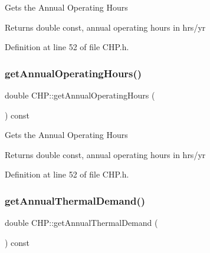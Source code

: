 Gets the Annual Operating Hours

\begin{DoxyReturn}{Returns}
double const, annual operating hours in hrs/yr 
\end{DoxyReturn}


Definition at line 52 of file C\+H\+P.\+h.

\mbox{\label{class_c_h_p_aeeb03f1f40db034babf883a1e00ed2a3}} 
\subsubsection{\texorpdfstring{get\+Annual\+Operating\+Hours()}{getAnnualOperatingHours()}\hspace{0.1cm}{\footnotesize\ttfamily [3/3]}}
{\footnotesize\ttfamily double C\+H\+P\+::get\+Annual\+Operating\+Hours (\begin{DoxyParamCaption}{ }\end{DoxyParamCaption}) const\hspace{0.3cm}{\ttfamily [inline]}}

Gets the Annual Operating Hours

\begin{DoxyReturn}{Returns}
double const, annual operating hours in hrs/yr 
\end{DoxyReturn}


Definition at line 52 of file C\+H\+P.\+h.

\mbox{\label{class_c_h_p_a849a576483b92b131ebfc0615e1e0bdb}} 
\subsubsection{\texorpdfstring{get\+Annual\+Thermal\+Demand()}{getAnnualThermalDemand()}\hspace{0.1cm}{\footnotesize\ttfamily [1/3]}}
{\footnotesize\ttfamily double C\+H\+P\+::get\+Annual\+Thermal\+Demand (\begin{DoxyParamCaption}{ }\end{DoxyParamCaption}) const\hspace{0.3cm}{\ttfamily [inline]}}

